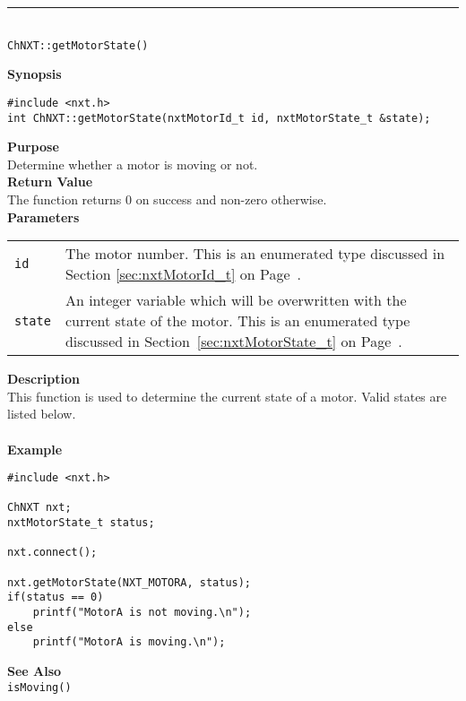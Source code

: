 \noindent
\vspace{5pt}
\rule{4.5in}{0.015in}\\
\noindent
{\LARGE \texttt{ChNXT::getMotorState()}}\\
{}

\noindent
{\bf Synopsis}
\begin{lstlisting}
#include <nxt.h>
int ChNXT::getMotorState(nxtMotorId_t id, nxtMotorState_t &state);
\end{lstlisting}

\noindent
{\bf Purpose}\\
Determine whether a motor is moving or not.\\

\noindent
{\bf Return Value}\\
The function returns 0 on success and non-zero otherwise.\\

\noindent
{\bf Parameters}
\vspace{-0.1in}
\begin{description}
\item               
\begin{tabular}{p{10 mm}p{145 mm}}
\texttt{id} & The motor number. This is an enumerated type 
discussed in Section \ref{sec:nxtMotorId_t} on Page~\pageref{sec:nxtMotorId_t}.\\
\texttt{state} & An integer variable which will be overwritten with the current 
state of the motor. This is an enumerated type discussed in 
Section~\ref{sec:nxtMotorState_t} on Page~\pageref{sec:nxtMotorState_t}.\\
\end{tabular}
\end{description}

\noindent
{\bf Description}\\
This function is used to determine the current state of a motor. Valid states are listed below.\\
\\


\noindent
{\bf Example}
\begin{lstlisting}
#include <nxt.h>

ChNXT nxt;
nxtMotorState_t status;

nxt.connect();

nxt.getMotorState(NXT_MOTORA, status);
if(status == 0)
    printf("MotorA is not moving.\n");
else
    printf("MotorA is moving.\n");
\end{lstlisting}

\noindent
{\bf See Also}\\
\texttt{isMoving()}\\
